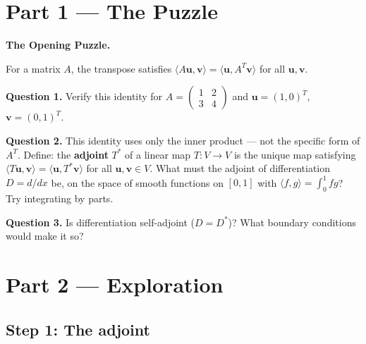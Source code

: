 \documentclass[12pt,a4paper]{article}
\begin{document}
\newpage

\section{Part 1 \texorpdfstring{---}{--} The Puzzle}

\begin{puzzlebox}
\textbf{The Opening Puzzle.}

For a matrix $A$, the transpose satisfies $\langle A\mathbf{u},\mathbf{v}\rangle = \langle\mathbf{u},A^T\mathbf{v}\rangle$ for all $\mathbf{u},\mathbf{v}$.

\medskip
\textbf{Question 1.} Verify this identity for $A = \begin{pmatrix}1&2\\3&4\end{pmatrix}$ and $\mathbf{u}=(1,0)^T$, $\mathbf{v}=(0,1)^T$.

\textbf{Question 2.} This identity uses only the inner product --- not the specific form of $A^T$. Define: the \textbf{adjoint} $T^*$ of a linear map $T:V\to V$ is the unique map satisfying $\langle T\mathbf{u},\mathbf{v}\rangle = \langle\mathbf{u},T^*\mathbf{v}\rangle$ for all $\mathbf{u},\mathbf{v}\in V$. What must the adjoint of differentiation $D = d/dx$ be, on the space of smooth functions on $[0,1]$ with $\langle f,g\rangle = \int_0^1 fg$? Try integrating by parts.

\textbf{Question 3.} Is differentiation self-adjoint ($D = D^*$)? What boundary conditions would make it so?
\end{puzzlebox}

\section{Part 2 \texorpdfstring{---}{--} Exploration}

\subsection{Step 1: The adjoint}
\end{document}
